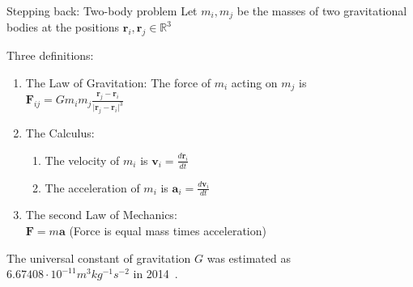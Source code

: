 \documentclass[\classoption]{beamer}
\begin{document}
\begin{frame}{Stepping back: Two-body problem}
Let $m_i,m_j$ be the masses of two gravitational bodies at the positions $\mathbf{r}_i,\mathbf{r}_j\in\mathbb{R}^3$

\begin{block}{Three definitions:}
\begin{enumerate}
\item The Law of Gravitation: The force of $m_i$ acting on $m_j$ is \\
$\mathbf{F}_{ij}= G m_i m_j \frac{\mathbf{r}_j-\mathbf{r}_i}{\vert \mathbf{r}_j-\mathbf{r}_i \vert^3}$
\item The Calculus: 
\begin{enumerate}
\item The velocity of $m_i$ is $\mathbf{v}_i = \frac{d \mathbf{r}_i}{dt}$
\item The acceleration of $m_i$ is $\mathbf{a}_i = \frac{d \mathbf{v}_i}{dt}$
\end{enumerate}
\item The second Law of Mechanics: \\
 $\mathbf{F}= m \mathbf{a}$ (Force is equal mass times acceleration)
\end{enumerate}
\end{block}
The universal constant of gravitation $G$ was estimated as $6.67408\cdot 10^{-11}m^3kg^{-1}s^{-2}$ in 2014~\cite{mohr2016codata}.
\end{frame}
\end{document}
